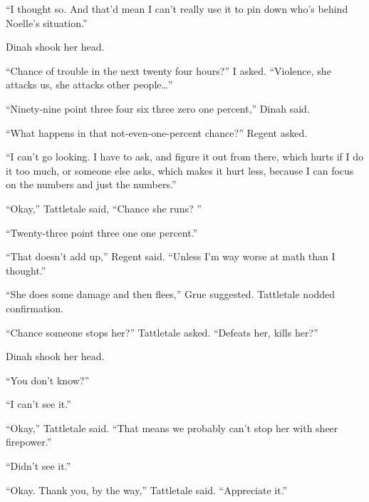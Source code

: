 ``I thought so.  And that'd mean I can't really use it to pin down who's behind Noelle's situation.''



Dinah shook her head.



``Chance of trouble in the next twenty four hours?'' I asked.  ``Violence, she attacks us, she attacks other people\ldots''



``Ninety-nine point three four six three zero one percent,'' Dinah said.



``What happens in that not-even-one-percent chance?'' Regent asked.



``I can't go looking.  I have to ask, and figure it out from there, which hurts if I do it too much, or someone else asks, which makes it hurt less, because I can focus on the numbers and just the numbers.''



``Okay,'' Tattletale said, ``Chance she runs? ''



``Twenty-three point three one one percent.''



``That doesn't add up,'' Regent said.  ``Unless I'm way worse at math than I thought.''



``She does some damage and then flees,'' Grue suggested.  Tattletale nodded confirmation.



``Chance someone stops her?'' Tattletale asked.  ``Defeats her, kills her?''



Dinah shook her head.



``You don't know?''



``I can't see it.''



``Okay,'' Tattletale said.  ``That means we probably can't stop her with sheer firepower.''



``Didn't see it.''



``Okay.  Thank you, by the way,'' Tattletale said.  ``Appreciate it.''



